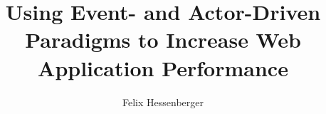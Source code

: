 \documentclass[master, english]{hgbthesis}
\begin{document}
\title{Using Event- and Actor-Driven Paradigms to Increase Web Application Performance}

\author{Felix Hessenberger}

\frontmatter
\maketitle
\tableofcontents 
	
			

		

\mainmatter	












 
\appendix



\end{document}
